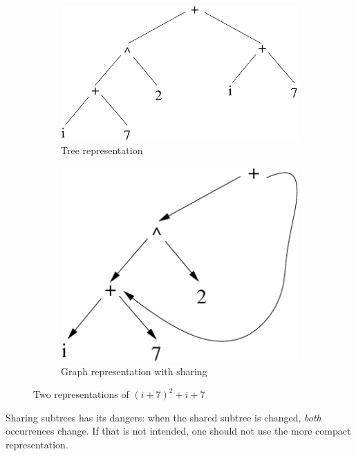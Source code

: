 \begin{figure}[ht]
	\centering
	\begin{subfigure}{0.4\linewidth}
		\centering
		\includegraphics[width=\linewidth,keepaspectratio]{boomexpressie}
		\caption{Tree representation}
		\label{boomexpressie}
	\end{subfigure}\qquad\qquad
	\begin{subfigure}{0.3\linewidth}
		\centering
		\includegraphics[width=\linewidth,keepaspectratio]{grafeexpressie}
		\caption{Graph representation with sharing}
		\label{graafexpressie}
	\end{subfigure}
	\caption{Two representations of $(i+7)^{2} + i + 7$}
\end{figure}

Sharing subtrees has its dangers: when the shared subtree is changed,
{\em both} occurrences change. If that is not intended, one should not
use the more compact representation.

